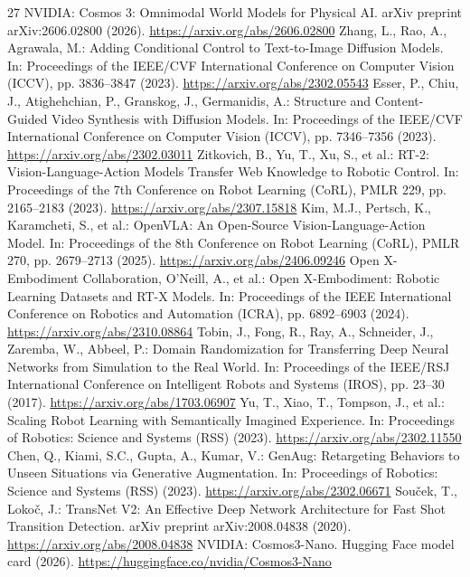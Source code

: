 \documentclass[runningheads]{llncs}
\begin{document}
\begin{thebibliography}{27}
 NVIDIA: Cosmos 3: Omnimodal World Models for Physical AI. arXiv preprint arXiv:2606.02800 (2026). \url{https://arxiv.org/abs/2606.02800}
 Zhang, L., Rao, A., Agrawala, M.: Adding Conditional Control to Text-to-Image Diffusion Models. In: Proceedings of the IEEE/CVF International Conference on Computer Vision (ICCV), pp. 3836--3847 (2023). \url{https://arxiv.org/abs/2302.05543}
 Esser, P., Chiu, J., Atighehchian, P., Granskog, J., Germanidis, A.: Structure and Content-Guided Video Synthesis with Diffusion Models. In: Proceedings of the IEEE/CVF International Conference on Computer Vision (ICCV), pp. 7346--7356 (2023). \url{https://arxiv.org/abs/2302.03011}
 Zitkovich, B., Yu, T., Xu, S., et al.: RT-2: Vision-Language-Action Models Transfer Web Knowledge to Robotic Control. In: Proceedings of the 7th Conference on Robot Learning (CoRL), PMLR 229, pp. 2165--2183 (2023). \url{https://arxiv.org/abs/2307.15818}
 Kim, M.J., Pertsch, K., Karamcheti, S., et al.: OpenVLA: An Open-Source Vision-Language-Action Model. In: Proceedings of the 8th Conference on Robot Learning (CoRL), PMLR 270, pp. 2679--2713 (2025). \url{https://arxiv.org/abs/2406.09246}
 Open X-Embodiment Collaboration, O'Neill, A., et al.: Open X-Embodiment: Robotic Learning Datasets and RT-X Models. In: Proceedings of the IEEE International Conference on Robotics and Automation (ICRA), pp. 6892--6903 (2024). \url{https://arxiv.org/abs/2310.08864}
 Tobin, J., Fong, R., Ray, A., Schneider, J., Zaremba, W., Abbeel, P.: Domain Randomization for Transferring Deep Neural Networks from Simulation to the Real World. In: Proceedings of the IEEE/RSJ International Conference on Intelligent Robots and Systems (IROS), pp. 23--30 (2017). \url{https://arxiv.org/abs/1703.06907}
 Yu, T., Xiao, T., Tompson, J., et al.: Scaling Robot Learning with Semantically Imagined Experience. In: Proceedings of Robotics: Science and Systems (RSS) (2023). \url{https://arxiv.org/abs/2302.11550}
 Chen, Q., Kiami, S.C., Gupta, A., Kumar, V.: GenAug: Retargeting Behaviors to Unseen Situations via Generative Augmentation. In: Proceedings of Robotics: Science and Systems (RSS) (2023). \url{https://arxiv.org/abs/2302.06671}
 Sou\v{c}ek, T., Loko\v{c}, J.: TransNet V2: An Effective Deep Network Architecture for Fast Shot Transition Detection. arXiv preprint arXiv:2008.04838 (2020). \url{https://arxiv.org/abs/2008.04838}
 NVIDIA: Cosmos3-Nano. Hugging Face model card (2026). \url{https://huggingface.co/nvidia/Cosmos3-Nano}

\end{thebibliography}
\end{document}
